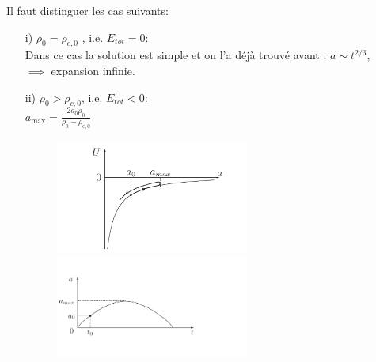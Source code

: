 \documentclass[a4paper,12pt]{report}
\theoremstyle{plain}
\theoremstyle{plain}
\begin{document}
%  
Il faut distinguer les cas suivants: 
\begin{enumerate}
	\item[i)] $\rho_0 =\rho_{c,0}$ , i.e. $E_{tot}=0:$ \\

	Dans ce cas la solution est simple et on l'a d\'ej\`a trouv\'e avant : $a \sim t^{2/3}$, \\$\implies $ expansion infinie. 
	\item[ii)] $\rho_0 > \rho_{c,0} $, i.e. $E_{tot} <0$:\\
	$a_{\max} = \frac{2a_0 \rho_0}{\rho_0 - \rho_{c,0}}$ 
	
	
	\begin{figure}[h]
\begin{minipage}{14pc}
\includegraphics[width=15pc]{t10.png}
\caption{}
\end{minipage}\hspace{3pc}%
\begin{minipage}{14pc}
\includegraphics[width=15pc]{t11.png}
\caption{}
\end{minipage}\hspace{3pc}%
\end{figure}


\end{enumerate}
\end{document}
